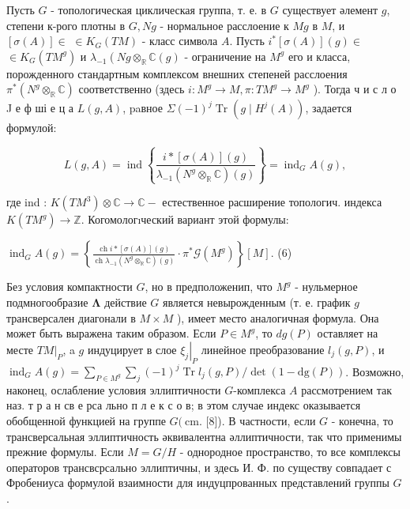 \documentclass[10pt]{article}
\begin{document}
Пусть $G$ - топологическая циклическая группа, т. е. в $G$ существует әлемент $g$, степени к-рого плотны в $G, N g$ - нормальное расслоение к $M g$ в $M$, и $[\sigma(A)] \in$ $\in K_{G}(T M)$ - класс символа $A$. Пусть $i^{*}[\sigma(A)](g) \in$ $\in K_{G}\left(T M^{g}\right)$ и $\lambda_{-1}\left(N g \otimes_{\mathbb{R}} \mathbb{C}(g)\right.$ - ограничение на $M^{g}$ его и класса, порожденного стандартным комплексом внешних степеней расслоения $\pi^{*}\left(N^{g} \otimes_{\mathbb{R}} \mathbb{C}\right)$ соответственно (здесь $i: M^{g} \rightarrow M, \pi: T M^{g} \rightarrow M^{g}$ ). Тогда ч и с л о J е ф ші е ц а $L(g, A)$, paвное $\Sigma(-1)^{j} \operatorname{Tr}\left(g \mid H^{j}(A)\right)$, задается формулой:



\[

L(g, A)=\operatorname{ind}\left\{\frac{i *[\sigma(A)](g)}{\lambda_{-1}\left(N^{g} \otimes_{\mathbb{R}} \mathbb{C}\right)(g)}\right\}=\operatorname{ind}_{G} A(g),

\]



где ind : $K\left(T M^{3}\right) \otimes \mathbb{C} \rightarrow \mathbb{C}-$ естественное расширение топологич. индекса $K\left(T M^{g}\right) \rightarrow \mathbb{Z}$. Когомологıческий вариант этой формулы:



$\operatorname{ind}_{G} A(g)=\left\{\frac{\operatorname{ch} i *[\sigma(A)](g)}{\operatorname{ch} \lambda_{-1}\left(N^{g} \otimes_{\mathbb{R}} \mathbb{C}\right)(g)} \cdot \pi^{*} \mathscr{G}\left(M^{g}\right)\right\}[M]$. (6)



Без условия компактности $G$, но в предположенип, что $M^{g}$ - нульмерное подмногообразие $\boldsymbol{\Lambda}$ действие $G$ является невырожденным (т. е. график $g$ трансверсален диагонали в $M \times M$ ), имеет место аналогичная формула. Она может быть выражена таким образом. Если $P \in M^{g}$, то $d g(P)$ оставляет на месте $\left.T M\right|_{P}$, a $g$ индуцирует в слое $\left.\xi_{j}\right|_{P}$ линейное преобразование $l_{j}(g, P)$, и $\operatorname{ind}_{G} A(g)=\sum_{P \in M^{g}} \sum_{j}(-1)^{j} \operatorname{Tr} l_{j}(g, P) / \operatorname{det}(1-\mathrm{dg}(P))$. Возможно, наконец, ослабление условия эллиптичности $G$-комплекса $A$ рассмотрением так наз. т р а н св е рса льно п л е к с о в; в этом случае индекс оказывается обобщенной функцией на группе $G(\mathrm{~cm}$. [8]). В частности, если $G$ - конечна, то трансверсальная эллиптичность әквивалентна әллиптичности, так что применимы прежние формулы. Если $M=G / H$ - однородное пространство, то все комплексы операторов трансвсрсально эллиптичны, и здесь И. Ф. по существу совпадает с Фробениуса формулой взаимности для индуцпрованных представлений группы $G$.
\end{document}
